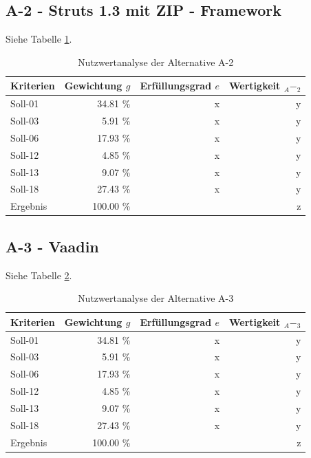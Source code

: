   \subsection{A-2 - Struts 1.3 mit ZIP - Framework}
  
  Siehe Tabelle \ref{tab:nwaA2}.
  
  \begin{table}[ht]
    \sffamily 
    \begin{center}
      \begin{tabular}{l|rrr}
        \toprule
        Kriterien & Gewichtung \(g\) & Erfüllungsgrad \(e\) & Wertigkeit
        \(_A-_2\) \\
        \midrule
        Soll-01   & 34.81 \% & x & y \\
        Soll-03   &  5.91 \% & x & y \\
        Soll-06   & 17.93 \% & x & y \\
        Soll-12   &  4.85 \% & x & y \\
        Soll-13   &  9.07 \% & x & y \\
        Soll-18   & 27.43 \% & x & y \\
        \midrule
        \midrule
        Ergebnis  & 100.00 \% &   & z \\
        \bottomrule
      \end{tabular}
      \caption{Nutzwertanalyse der Alternative A-2}
      \label{tab:nwaA2}
    \end{center}
  \end{table}
  
  \subsection{A-3 - Vaadin}
  
  Siehe Tabelle \ref{tab:nwaA3}.
  
  \begin{table}[ht]
    \sffamily 
    \begin{center}
      \begin{tabular}{l|rrr}
        \toprule
        Kriterien & Gewichtung \(g\) & Erfüllungsgrad \(e\) & Wertigkeit
        \(_A-_3\) \\
        \midrule
        Soll-01   & 34.81 \% & x & y \\
        Soll-03   &  5.91 \% & x & y \\
        Soll-06   & 17.93 \% & x & y \\
        Soll-12   &  4.85 \% & x & y \\
        Soll-13   &  9.07 \% & x & y \\
        Soll-18   & 27.43 \% & x & y \\
        \midrule
        \midrule
        Ergebnis  & 100.00 \% &   & z \\
        \bottomrule
      \end{tabular}
      \caption{Nutzwertanalyse der Alternative A-3}
      \label{tab:nwaA3}
    \end{center}
  \end{table}
  
